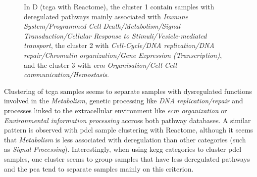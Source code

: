 \begin{figure}
\begin{center}
{            In D (\acrshort{tcga} with Reactome), the cluster 1 contain samples with deregulated pathways mainly associated with \textit{Immune System/Programmed Cell Death/Metabolism/Signal Transduction/Cellular Response to Stimuli/Vesicle-mediated transport}, the cluster 2 with \textit{Cell-Cycle/DNA replication/DNA repair/Chromatin organization/Gene Expression (Transcription)}, and the cluster 3 with \textit{\acrlong{ecm} Organisation/Cell-Cell communication/Hemostasis}.
        }
        \label{fig:cluster-plot}
    \end{center}
\end{figure}

Clustering of \acrshort{tcga} samples seems to separate samples with dysregulated functions involved in the \textit{Metabolism}, genetic processing like \textit{DNA replication/repair} and processes linked to the extracellular environment like \textit{\acrshort{ecm} organization} or \textit{Environmental information processing} accross both pathway databases.
A similar pattern is observed with \acrshort{pdcl} sample clustering with Reactome, although it seems that \textit{Metabolism} is less associated with deregulation than other categories (such as \textit{Signal Processing}).
Interestingly, when using \acrshort{kegg} categories to cluster \acrshort{pdcl} samples, one cluster seems to group samples that have less deregulated pathways and the \acrshort{pca} tend to separate samples mainly on this criterion.

